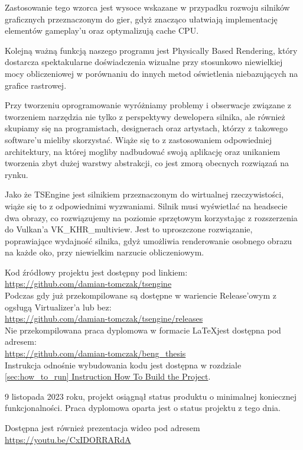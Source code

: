 Zastosowanie tego wzorca jest wysoce wskazane w przypadku rozwoju silników graficznych przeznaczonym do gier, gdyż znacząco ułatwiają implementację elementów gameplay’u oraz optymalizują cache CPU. 

Kolejną ważną funkcją naszego programu jest Physically Based Rendering, który dostarcza spektakularne doświadczenia wizualne przy stosunkowo niewielkiej mocy obliczeniowej w porównaniu do innych metod oświetlenia niebazujących na grafice rastrowej. 

Przy tworzeniu oprogramowanie wyróżniamy problemy i obserwacje związane z tworzeniem narzędzia nie tylko z perspektywy dewelopera silnika, ale również skupiamy się na programistach, designerach oraz artystach, którzy z takowego software’u mieliby skorzystać. Wiąże się to z zastosowaniem odpowiedniej architektury, na której mogliby nadbudować swoją aplikację oraz unikaniem tworzenia zbyt dużej warstwy abstrakcji, co jest zmorą obecnych rozwiązań na rynku. 

Jako że TSEngine jest silnikiem przeznaczonym do wirtualnej rzeczywistości, wiąże się to z odpowiednimi wyzwaniami. Silnik musi wyświetlać na headsecie dwa obrazy, co rozwiązujemy na poziomie sprzętowym korzystając z rozszerzenia do Vulkan’a VK\_KHR\_multiview. Jest to uproszczone rozwiązanie, poprawiające wydajność silnika, gdyż umożliwia renderowanie osobnego obrazu na każde oko, przy niewielkim narzucie obliczeniowym. 

Kod źródłowy projektu jest dostępny pod linkiem:\\
\href{https://github.com/damian-tomczak/tsengine}{https://github.com/damian-tomczak/tsengine}\\
Podczas gdy już przekompilowane są dostępne w wariencie Release'owym z ogsługą Virtualizer'a lub bez:\\
\href{https://github.com/damian-tomczak/tsengine/releases}{https://github.com/damian-tomczak/tsengine/releases}\\
Nie przekompilowana praca dyplomowa w formacie \LaTeX jest dostępna pod adresem:\\
\href{https://github.com/damian-tomczak/beng_thesis}{https://github.com/damian-tomczak/beng\_thesis}\\
Instrukcja odnośnie wybudowania kodu jest dostępna w rozdziale \hyperref[sec:how_to_run]{\ref*{sec:how_to_run} Instruction How To Build the Project}.

9 listopada 2023 roku, projekt osiągnął status produktu o minimalnej koniecznej funkcjonalności. Praca dyplomowa oparta jest o status projektu z tego dnia.

Dostępna jest również prezentacja wideo pod adresem \href{https://youtu.be/CxIDORRARdA}{https://youtu.be/CxIDORRARdA}
